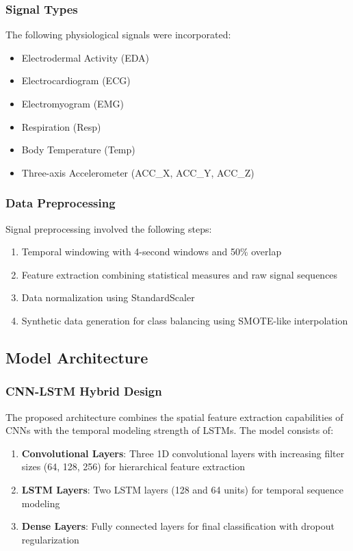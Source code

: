 \documentclass[11pt,a4paper]{article}
\begin{document}
\subsubsection{Signal Types}
The following physiological signals were incorporated:
\begin{itemize}
    \item Electrodermal Activity (EDA)
    \item Electrocardiogram (ECG)
    \item Electromyogram (EMG)
    \item Respiration (Resp)
    \item Body Temperature (Temp)
    \item Three-axis Accelerometer (ACC\_X, ACC\_Y, ACC\_Z)
\end{itemize}

\subsubsection{Data Preprocessing}
Signal preprocessing involved the following steps:
\begin{enumerate}
    \item Temporal windowing with 4-second windows and 50\% overlap
    \item Feature extraction combining statistical measures and raw signal sequences
    \item Data normalization using StandardScaler
    \item Synthetic data generation for class balancing using SMOTE-like interpolation
\end{enumerate}

\subsection{Model Architecture}

\subsubsection{CNN-LSTM Hybrid Design}

The proposed architecture combines the spatial feature extraction capabilities of CNNs with the temporal modeling strength of LSTMs. The model consists of:

\begin{enumerate}
    \item \textbf{Convolutional Layers}: Three 1D convolutional layers with increasing filter sizes (64, 128, 256) for hierarchical feature extraction
    \item \textbf{LSTM Layers}: Two LSTM layers (128 and 64 units) for temporal sequence modeling
    \item \textbf{Dense Layers}: Fully connected layers for final classification with dropout regularization
\end{enumerate}
\end{document}

